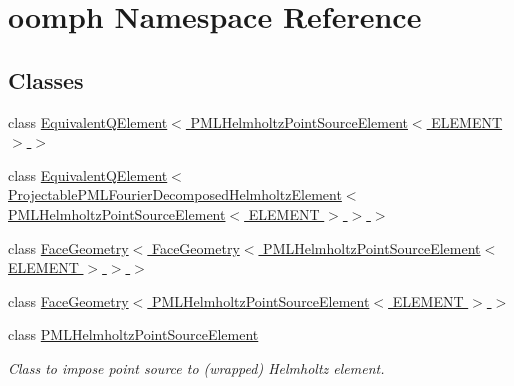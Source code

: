 \hypertarget{namespaceoomph}{}\section{oomph Namespace Reference}
\label{namespaceoomph}
\subsection*{Classes}
\begin{DoxyCompactItemize}
\item 
class \hyperlink{classoomph_1_1EquivalentQElement_3_01PMLHelmholtzPointSourceElement_3_01ELEMENT_01_4_01_4}{Equivalent\+Q\+Element$<$ P\+M\+L\+Helmholtz\+Point\+Source\+Element$<$ E\+L\+E\+M\+E\+N\+T $>$ $>$}
\item 
class \hyperlink{classoomph_1_1EquivalentQElement_3_01ProjectablePMLFourierDecomposedHelmholtzElement_3_01PMLHelmea655fba41d5fa485ebddcd1b3c02e7e}{Equivalent\+Q\+Element$<$ Projectable\+P\+M\+L\+Fourier\+Decomposed\+Helmholtz\+Element$<$ P\+M\+L\+Helmholtz\+Point\+Source\+Element$<$ E\+L\+E\+M\+E\+N\+T $>$ $>$ $>$}
\item 
class \hyperlink{classoomph_1_1FaceGeometry_3_01FaceGeometry_3_01PMLHelmholtzPointSourceElement_3_01ELEMENT_01_4_01_4_01_4}{Face\+Geometry$<$ Face\+Geometry$<$ P\+M\+L\+Helmholtz\+Point\+Source\+Element$<$ E\+L\+E\+M\+E\+N\+T $>$ $>$ $>$}
\item 
class \hyperlink{classoomph_1_1FaceGeometry_3_01PMLHelmholtzPointSourceElement_3_01ELEMENT_01_4_01_4}{Face\+Geometry$<$ P\+M\+L\+Helmholtz\+Point\+Source\+Element$<$ E\+L\+E\+M\+E\+N\+T $>$ $>$}
\item 
class \hyperlink{classoomph_1_1PMLHelmholtzPointSourceElement}{P\+M\+L\+Helmholtz\+Point\+Source\+Element}
\begin{DoxyCompactList}\small\item\em Class to impose point source to (wrapped) Helmholtz element. \end{DoxyCompactList}\end{DoxyCompactItemize}
